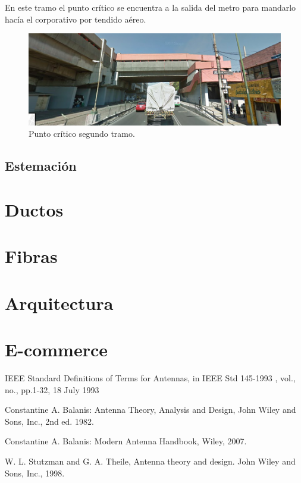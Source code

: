 \documentclass[12pt,letterpaper]{article}
\begin{document}
En este tramo el punto crítico se encuentra a la salida del metro 
para mandarlo hacía el corporativo por tendido aéreo.
\begin{figure}[ht]
    \centering
    \includegraphics[width=.9\textwidth]{f10.png}
    \caption{Punto crítico segundo tramo.}
\end{figure}

\newpage
\subsection{Estemación}

\newpage
\section{Ductos}

\newpage
\section{Fibras}

\newpage
\section{Arquitectura}

\newpage
\section{E-commerce}


\newpage
\begin{thebibliography}{20}
    IEEE Standard Definitions of Terms for Antennas, in IEEE Std 145-1993 , vol., no., pp.1-32, 18 July 1993

    Constantine A. Balanis: Antenna Theory, Analysis and Design, John Wiley and Sons, Inc., 2nd ed. 1982.
    
    Constantine A. Balanis: Modern Antenna Handbook, Wiley, 2007.

    W. L. Stutzman and G. A. Theile, Antenna theory and design. John Wiley and Sons, Inc., 1998.
\end{thebibliography}
\end{document}
